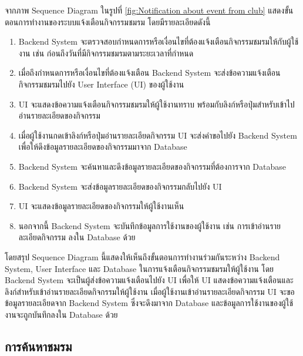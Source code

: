 \documentclass[14pt,oneside,openright,a4paper]{cpe-thai-project}
\begin{document}
  จากภาพ Sequence Diagram ในรูปที่ \ref{fig:Notification about event from club} แสดงขั้นตอนการทำงานของระบบแจ้งเตือนกิจกรรมชมรม โดยมีรายละเอียดดังนี้
  \begin{enumerate}
    \item Backend System จะตรวจสอบกำหนดการหรือเงื่อนไขที่ต้องแจ้งเตือนกิจกรรมชมรมให้กับผู้ใช้งาน เช่น ก่อนถึงวันที่มีกิจกรรมชมรมตามระยะเวลาที่กำหนด
    \item เมื่อถึงกำหนดการหรือเงื่อนไขที่ต้องแจ้งเตือน Backend System จะส่งข้อความแจ้งเตือนกิจกรรมชมรมไปยัง User Interface (UI) ของผู้ใช้งาน
    \item UI จะแสดงข้อความแจ้งเตือนกิจกรรมชมรมให้ผู้ใช้งานทราบ พร้อมกับลิงก์หรือปุ่มสำหรับเข้าไปอ่านรายละเอียดของกิจกรรม
    \item เมื่อผู้ใช้งานกดเข้าลิงก์หรือปุ่มอ่านรายละเอียดกิจกรรม UI จะส่งคำขอไปยัง Backend System เพื่อให้ดึงข้อมูลรายละเอียดของกิจกรรมมาจาก Database
    \item Backend System จะค้นหาและดึงข้อมูลรายละเอียดของกิจกรรมที่ต้องการจาก Database
    \item Backend System จะส่งข้อมูลรายละเอียดของกิจกรรมกลับไปยัง UI
    \item UI จะแสดงข้อมูลรายละเอียดของกิจกรรมให้ผู้ใช้งานเห็น
    \item นอกจากนี้ Backend System จะบันทึกข้อมูลการใช้งานของผู้ใช้งาน เช่น การเข้าอ่านรายละเอียดกิจกรรม ลงใน Database ด้วย
  \end{enumerate}
  โดยสรุป Sequence Diagram นี้แสดงให้เห็นถึงขั้นตอนการทำงานร่วมกันระหว่าง Backend System, User Interface และ Database ในการแจ้งเตือนกิจกรรมชมรมให้ผู้ใช้งาน โดย Backend System จะเป็นผู้ส่งข้อความแจ้งเตือนไปยัง UI เพื่อให้ UI แสดงข้อความแจ้งเตือนและลิงก์สำหรับเข้าอ่านรายละเอียดกิจกรรมให้ผู้ใช้งาน เมื่อผู้ใช้งานเข้าอ่านรายละเอียดกิจกรรม UI จะขอข้อมูลรายละเอียดจาก Backend System ซึ่งจะดึงมาจาก Database และข้อมูลการใช้งานของผู้ใช้งานจะถูกบันทึกลงใน Database ด้วย

  \newpage

\subsection{การค้นหาชมรม}
\end{document}
